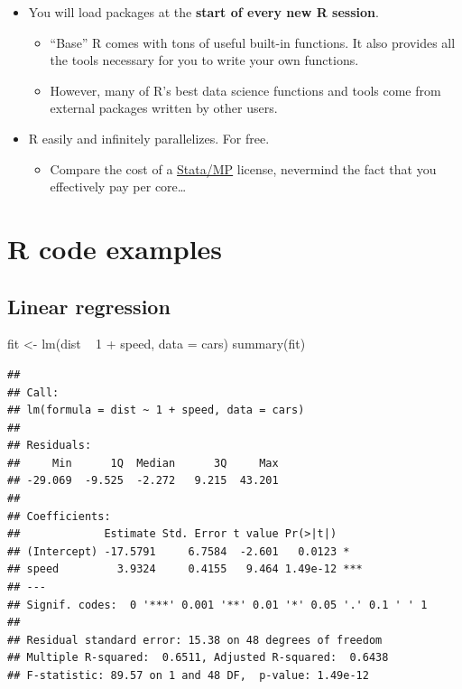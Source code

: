 \documentclass[]{book}
\newenvironment{Shaded}{}{}
\newcommand{\DataTypeTok}[1]{#1}
\newcommand{\DecValTok}[1]{#1}
\newcommand{\KeywordTok}[1]{\textcolor[rgb]{0.00,0.00,1.00}{#1}}
\newcommand{\NormalTok}[1]{#1}
\newcommand{\OperatorTok}[1]{#1}
\newcommand{\StringTok}[1]{\textcolor[rgb]{0.00,0.50,0.50}{#1}}
\providecommand{\tightlist}{%
  \setlength{\itemsep}{0pt}\setlength{\parskip}{0pt}}
\begin{document}
\begin{itemize}
\tightlist
\item
  You will load packages at the \textbf{start of every new R session}.

  \begin{itemize}
  \tightlist
  \item
    ``Base'' R comes with tons of useful built-in functions. It also provides all the tools necessary for you to write your own functions.
  \item
    However, many of R's best data science functions and tools come from external packages written by other users.
  \end{itemize}
\item
  R easily and infinitely parallelizes. For free.

  \begin{itemize}
  \tightlist
  \item
    Compare the cost of a \href{https://www.stata.com/statamp/}{Stata/MP} license, nevermind the fact that you effectively pay per core\ldots{}
  \end{itemize}
\end{itemize}

\hypertarget{r-code-examples}{%
\section{R code examples}\label{r-code-examples}}

\hypertarget{linear-regression}{%
\subsection{Linear regression}\label{linear-regression}}

\begin{Shaded}
\begin{Highlighting}[]
\NormalTok{fit <-}\StringTok{ }\KeywordTok{lm}\NormalTok{(dist }\OperatorTok{~}\StringTok{ }\DecValTok{1} \OperatorTok{+}\StringTok{ }\NormalTok{speed, }\DataTypeTok{data =}\NormalTok{ cars)}
\KeywordTok{summary}\NormalTok{(fit)}
\end{Highlighting}
\end{Shaded}

\begin{verbatim}
## 
## Call:
## lm(formula = dist ~ 1 + speed, data = cars)
## 
## Residuals:
##     Min      1Q  Median      3Q     Max 
## -29.069  -9.525  -2.272   9.215  43.201 
## 
## Coefficients:
##             Estimate Std. Error t value Pr(>|t|)    
## (Intercept) -17.5791     6.7584  -2.601   0.0123 *  
## speed         3.9324     0.4155   9.464 1.49e-12 ***
## ---
## Signif. codes:  0 '***' 0.001 '**' 0.01 '*' 0.05 '.' 0.1 ' ' 1
## 
## Residual standard error: 15.38 on 48 degrees of freedom
## Multiple R-squared:  0.6511, Adjusted R-squared:  0.6438 
## F-statistic: 89.57 on 1 and 48 DF,  p-value: 1.49e-12
\end{verbatim}
\end{document}
